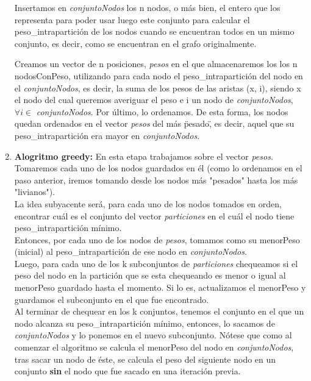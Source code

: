 \begin{enumerate}
Insertamos en \textit{conjuntoNodos} los n nodos, o más bien, el entero que los representa para poder usar luego este conjunto para calcular el peso\_intrapartición de los nodos cuando se encuentran todos en un mismo conjunto, es decir, como se encuentran en el grafo originalmente.

Creamos un vector de n posiciones, \textit{pesos} en el que almacenaremos los  los n nodosConPeso, utilizando para cada nodo el peso\_intrapartición del nodo en el \textit{conjuntoNodos}, es decir, la suma de los pesos de las aristas (x, i), siendo x el nodo del cual queremos averiguar el peso e i un nodo de \textit{conjuntoNodos}, $\forall i \in$ \textit{conjuntoNodos}. Por último, lo ordenamos. De esta forma, los nodos quedan ordenados en el vector \textit{pesos} del más \"pesado\", es decir, aquel que su peso\_intrapartición era mayor en \textit{conjuntoNodos}.\\

\item \textbf{Alogritmo greedy:}
En esta etapa trabajamos sobre el vector \textit{pesos}. Tomaremos cada uno de los nodos guardados en él (como lo ordenamos en el paso anterior, iremos tomando desde los nodos más "pesados" hasta los más "livianos").\\
La idea subyacente será, para cada uno de los nodos tomados en orden, encontrar cuál es el conjunto del vector \textit{particiones} en el cuál el nodo tiene peso\_intrapartición mínimo.\\
Entonces, por cada uno de los nodos de \textit{pesos}, tomamos como su menorPeso (inicial) al peso\_intrapartición de ese nodo en \textit{conjuntoNodos}.\\
Luego, para cada uno de los k subconjuntos de \textit{particiones} chequeamos si el peso del nodo en la partición que se esta chequeando es menor o igual al menorPeso guardado hasta el momento. Si lo es, actualizamos el menorPeso y guardamos el subconjunto en el que fue encontrado.\\
Al terminar de chequear en los k conjuntos, tenemos el conjunto en el que un nodo alcanza su peso\_intrapartición mínimo, entonces, lo sacamos de \textit{conjuntoNodos} y lo ponemos en el nuevo subconjunto. Nótese que como al comenzar el algoritmo se calcula el menorPeso del nodo en  \textit{conjuntoNodos}, tras sacar un nodo de éste, se calcula el peso del siguiente nodo en un conjunto \textbf{sin} el nodo que fue sacado en una iteración previa.\\
\end{enumerate}

